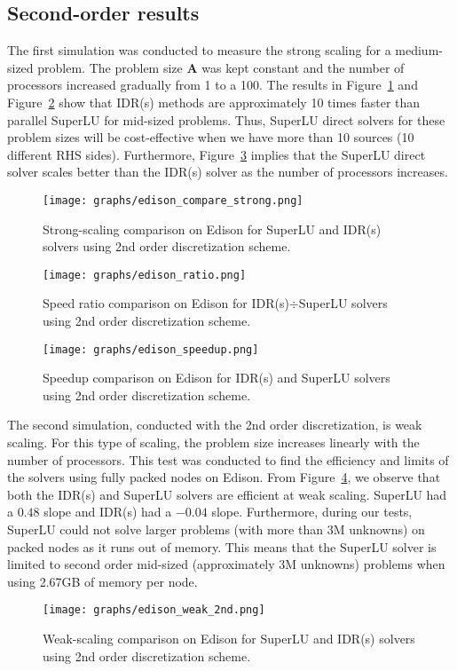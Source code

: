 \documentclass[12pt]{article}
\begin{document}
\subsection{Second-order results}\label{sec:second-order}
The first simulation was conducted to measure the strong scaling for a medium-sized problem. The problem size $\mathbf{A}$ was kept constant and the number of processors increased gradually from 1 to a 100. The results in Figure~\ref{fig:edison_compare_strong} and Figure~\ref{fig:edison_ratio} show that IDR(s) methods are approximately 10 times faster than parallel SuperLU for mid-sized problems. Thus, SuperLU direct solvers for these problem sizes will be cost-effective when we have more than 10 sources (10 different RHS sides). Furthermore, Figure~\ref{fig:edison_speedup} implies that the SuperLU direct solver scales better than the IDR(s) solver as the number of processors increases.  
\begin{figure}
	\centering
 \texttt{[image: graphs/edison\_compare\_strong.png]}
  \caption{Strong-scaling comparison on Edison for SuperLU and IDR(s) solvers using 2nd order discretization scheme.}
  \label{fig:edison_compare_strong}
\end{figure}
\begin{figure}
	\centering
 \texttt{[image: graphs/edison\_ratio.png]}
  \caption{Speed ratio comparison on Edison for IDR(s)$\div$SuperLU solvers using 2nd order discretization scheme.}
  \label{fig:edison_ratio}
\end{figure}
\begin{figure}
	\centering
 \texttt{[image: graphs/edison\_speedup.png]}
  \caption{Speedup comparison on Edison for IDR(s) and SuperLU solvers using 2nd order discretization scheme.}
  \label{fig:edison_speedup}
\end{figure}

The second simulation, conducted with the 2nd order discretization, is weak scaling. For this type of scaling, the problem size increases linearly with the number of processors. This test was conducted to find the efficiency and limits of the solvers using fully packed nodes on Edison. From Figure~\ref{fig:edison_weak_2nd}, we observe that both the IDR(s) and SuperLU solvers are efficient at weak scaling. SuperLU had a $0.48$ slope and IDR(s) had a $-0.04$ slope. Furthermore, during our tests, SuperLU could not solve larger problems (with more than 3M unknowns) on packed nodes as it runs out of memory. This means that the SuperLU solver is limited to second order mid-sized (approximately 3M unknowns) problems when using 2.67GB of memory per node.
\begin{figure}
	\centering
 \texttt{[image: graphs/edison\_weak\_2nd.png]}
  \caption{Weak-scaling comparison on Edison for SuperLU and IDR(s) solvers using 2nd order discretization scheme.}
  \label{fig:edison_weak_2nd}
\end{figure}
\end{document}

